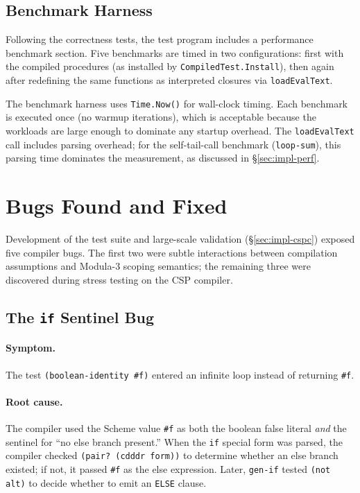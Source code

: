 \documentclass[12pt]{report}
\begin{document}
\subsection{Benchmark Harness}

Following the correctness tests, the test program includes a
performance benchmark section.  Five benchmarks are timed in two
configurations: first with the compiled procedures (as installed by
\texttt{CompiledTest.Install}), then again after redefining the same
functions as interpreted closures via \texttt{loadEvalText}.

The benchmark harness uses \texttt{Time.Now()} for wall-clock timing.
Each benchmark is executed once (no warmup iterations), which is
acceptable because the workloads are large enough to dominate any
startup overhead.  The \texttt{loadEvalText} call includes parsing
overhead; for the self-tail-call benchmark (\texttt{loop-sum}), this
parsing time dominates the measurement, as discussed in
\S\ref{sec:impl-perf}.

\section{Bugs Found and Fixed}
\label{sec:impl-bugs}

Development of the test suite and large-scale validation
(\S\ref{sec:impl-cspc}) exposed five compiler bugs.  The first two
were subtle interactions between compilation assumptions and Modula-3
scoping semantics; the remaining three were discovered during
stress testing on the CSP compiler.

\subsection{The \texttt{if} Sentinel Bug}
\label{sec:bug-if}

\paragraph{Symptom.}
The test \texttt{(boolean-identity \#f)} entered an infinite loop
instead of returning \texttt{\#f}.

\paragraph{Root cause.}
The compiler used the Scheme value \texttt{\#f} as both the boolean
false literal \emph{and} the sentinel for ``no else branch present.''
When the \texttt{if} special form was parsed, the compiler checked
\texttt{(pair?\ (cdddr form))} to determine whether an else branch
existed; if not, it passed \texttt{\#f} as the else expression.
Later, \texttt{gen-if} tested \texttt{(not alt)} to decide whether
to emit an \texttt{ELSE} clause.
\end{document}
